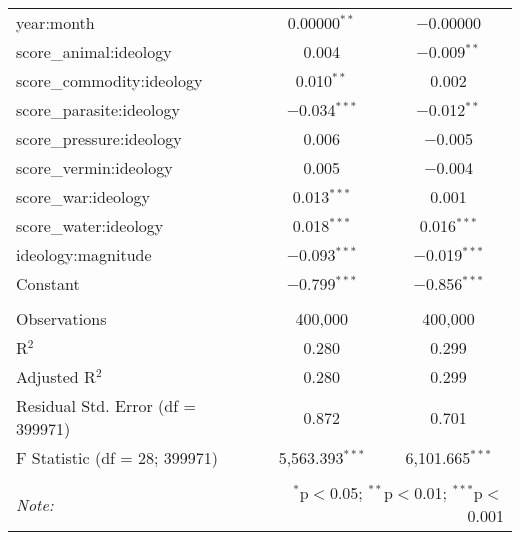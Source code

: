 \begin{table}[!htbp]
\begin{tabular}{@{\extracolsep{5pt}}lcc}
  year:month & 0.00000$^{**}$ & $-$0.00000 \\ 
  score\_animal:ideology & 0.004 & $-$0.009$^{**}$ \\ 
  score\_commodity:ideology & 0.010$^{**}$ & 0.002 \\ 
  score\_parasite:ideology & $-$0.034$^{***}$ & $-$0.012$^{**}$ \\ 
  score\_pressure:ideology & 0.006 & $-$0.005 \\ 
  score\_vermin:ideology & 0.005 & $-$0.004 \\ 
  score\_war:ideology & 0.013$^{***}$ & 0.001 \\ 
  score\_water:ideology & 0.018$^{***}$ & 0.016$^{***}$ \\ 
  ideology:magnitude & $-$0.093$^{***}$ & $-$0.019$^{***}$ \\ 
  Constant & $-$0.799$^{***}$ & $-$0.856$^{***}$ \\ 
 \hline \\[-1.8ex] 
Observations & 400,000 & 400,000 \\ 
R$^{2}$ & 0.280 & 0.299 \\ 
Adjusted R$^{2}$ & 0.280 & 0.299 \\ 
Residual Std. Error (df = 399971) & 0.872 & 0.701 \\ 
F Statistic (df = 28; 399971) & 5,563.393$^{***}$ & 6,101.665$^{***}$ \\ 
\hline 
\hline \\[-1.8ex] 
\textit{Note:}  & \multicolumn{2}{r}{$^{*}$p$<$0.05; $^{**}$p$<$0.01; $^{***}$p$<$0.001} \\ 
\end{tabular} 
\end{table} 
